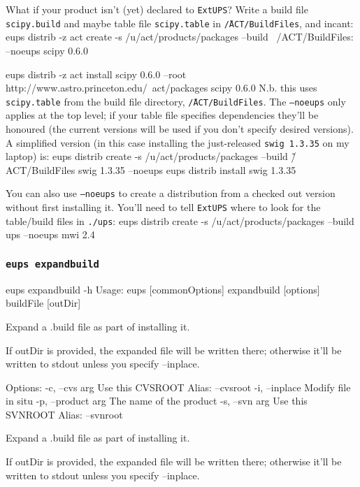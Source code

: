 \documentclass{article}
\newcommand{\code}[1]{\texttt{#1}}
\newcommand{\eups}{\code{ExtUPS}}
\let\overbatim=\verbatim
\let\oendverbatim=\endverbatim
\renewenvironment{verbatim}
{\center\minipage{16cm}\overbatim}
{\oendverbatim\endminipage\endcenter}
\begin{document}
What if your product isn't (yet) declared to \eups?  Write a build file \code{scipy.build} and
maybe table file \code{scipy.table} in \code{\~/ACT/BuildFiles}, and incant:
\begin{verbatim}
eups distrib -z act create -s /u/act/products/packages --build ~/ACT/BuildFiles: --noeups scipy 0.6.0

eups distrib -z act install scipy 0.6.0 --root http://www.astro.princeton.edu/~act/packages scipy 0.6.0
\end{verbatim}
N.b. this uses \code{scipy.table} from the build file directory, \code{\~/ACT/BuildFiles}. The
\code{--noeups} only applies at the top level;  if your table file specifies dependencies
they'll be honoured (the current versions will be used if you don't specify desired versions). A
simplified version (in this case installing the just-released \code{swig 1.3.35} on my laptop) is:
\begin{verbatim}
eups distrib create -s /u/act/products/packages --build \~/ACT/BuildFiles swig 1.3.35 --noeups
eups distrib install swig 1.3.35
\end{verbatim}

You can also use \code{--noeups} to create a distribution from a checked out version without
first installing it.  You'll need to tell \eups{} where to look for the table/build files
in \code{./ups}:
\begin{verbatim}
eups distrib create -s /u/act/products/packages --build ups --noeups mwi 2.4
\end{verbatim}


\subsubsection{\code{eups expandbuild}}
\begin{verbatim}
eups expandbuild -h
Usage:
    eups [commonOptions] expandbuild [options] buildFile [outDir]

    Expand a .build file as part of installing it.

    If outDir is provided, the expanded file will be written there;
    otherwise it'll be written to stdout unless you specify --inplace.

Options:
   -c, --cvs        arg    Use this CVSROOT
                           Alias: --cvsroot
   -i, --inplace           Modify file in situ
   -p, --product    arg    The name of the product
   -s, --svn        arg    Use this SVNROOT
                           Alias: --svnroot

Expand a .build file as part of installing it.

If outDir is provided, the expanded file will be written there;
otherwise it'll be written to stdout unless you specify --inplace.
\end{verbatim}
\end{document}
